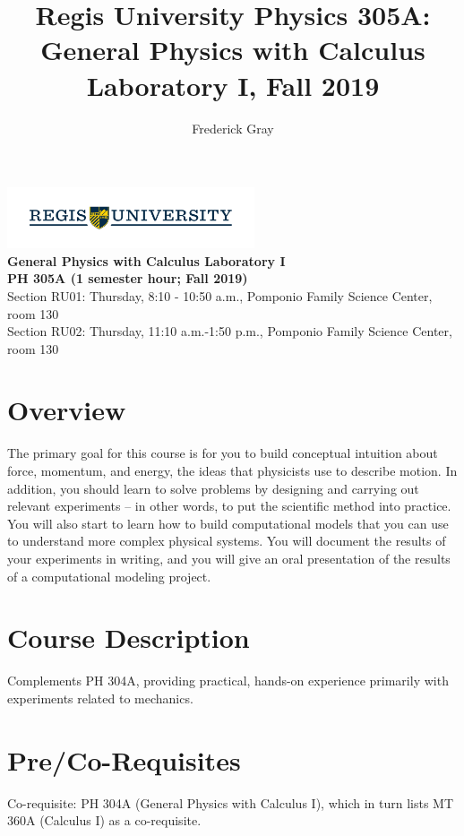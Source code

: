 \documentclass[11pt]{article}
\title{Regis University Physics 305A: General Physics with Calculus Laboratory I, Fall 2019}
\author{Frederick Gray}
\begin{document}
\begin{center}
\noindent\includegraphics[height=1.8cm] {RegisU_Logo.png}\\
\vspace{-0.5cm}
{\bf{General Physics with Calculus Laboratory I}} \\ 
{\bf{PH 305A (1 semester hour; Fall 2019)}} \\
{{Section RU01: Thursday, 8:10 - 10:50 a.m., Pomponio Family Science Center, room 130}} \\
{{Section RU02: Thursday, 11:10 a.m.-1:50 p.m., Pomponio Family Science Center, room 130}} 
\end{center}

\section{Overview}

The primary goal for this course is for you to build conceptual intuition 
about force, momentum, and energy, the ideas that physicists use to 
describe motion.  In addition, you should learn to solve problems by 
designing and carrying out relevant experiments -- in other words, to put the 
scientific method into practice.  You will also start to learn how to 
build computational models that you can use to understand more complex
physical systems.  You will document the results of your experiments in 
writing, and you will give an oral presentation of the results of a
computational modeling project.

\section{Course Description} 

Complements PH 304A, providing practical, hands-on experience primarily with experiments related to mechanics.

\section{Pre/Co-Requisites}

Co-requisite: PH 304A (General Physics with Calculus I), which in turn lists MT 360A (Calculus I) as a co-requisite.
\end{document}
